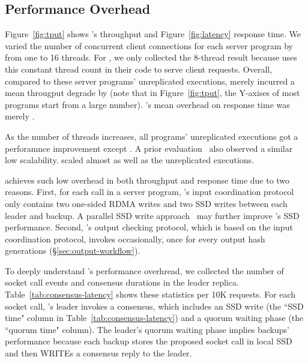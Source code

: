 \subsection{Performance Overhead} \label{sec:overhead}

Figure~\ref{fig:tput} shows \xxx's throughput and Figure~\ref{fig:latency} 
response time. We varied the number of concurrent client connections for each 
server program by from one to 16 threads. For \calvin, we only collected the 
8-thread result because \calvin uses this constant thread count in their code 
to serve client requests. Overall, compared to these server programs' 
unreplicated executions, \xxx merely incurred a mean througput degrade by 
\tputoverhead (note that in Figure~\ref{fig:tput}, the Y-axises of most programs 
start from a large number). \xxx's mean overhead on response time was merely 
\latencyoverhead.

As the number of threads increases, all programs' unreplicated executions 
got a perforamnce improvement except \memcached. A prior 
evaluation~\cite{rex:eurosys14} also observed a similar \memcached low 
scalability. \xxx scaled almost as well as the unreplicated executions.

\xxx achieves such low overhead in both throughput and response time due to two 
reasons. First, for each \recv call in a server program, \xxx's input 
coordination protocol only contains two one-sided RDMA writes and two SSD writes 
between each leader and backup. A parallel SSD write 
approach~\cite{Bessani:usenix13} may further improve \xxx's SSD performance.  
Second, \xxx's output checking protocol, which is based on the input 
coordination protocol, invokes occasionally, once for every \thashcomp output 
hash generations (\S\ref{sec:output-workflow}).


To deeply understand \xxx's performance overhread, we collected the number of 
socket call events and consensus durations in the leader replica. 
Table~\ref{tab:consensus-latency} shows these statistics per 10K requests. 
For each socket call, \xxx's leader invokes a consensus, which includes an SSD 
write (the ``SSD time" column in Table~\ref{tab:consensus-latency}) and a 
quorum waiting phase (the ``quorum time" column). The leader's quorum waiting 
phase implies backups' performance because each backup stores the proposed 
socket call in local SSD and then WRITEs a consensus reply to the leader. 

